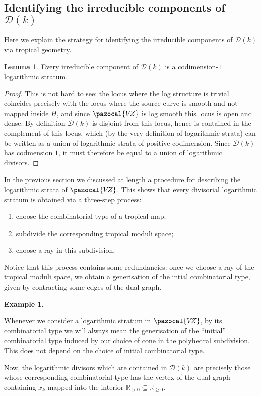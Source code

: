 \documentclass[11pt]{amsart}
\newcommand{\VZ}{\pazocal{V\!Z}}
\newcommand{\Dcal}{\mathcal{D}}
\newcommand{\RR}{\mathbb{R}}
\theoremstyle{definition}
\newtheorem{lemma}[thm]{Lemma}
\theoremstyle{definition}
\newtheorem{example}[thm]{Example}
\begin{document}
\subsection{Identifying the irreducible components of $\Dcal(k)$} Here we explain the strategy for identifying the irreducible components of $\Dcal(k)$ via tropical geometry.

\begin{lemma} Every irreducible component of $\Dcal(k)$ is a codimension-$1$ logarithmic stratum.\end{lemma}
\begin{proof} This is not hard to see: the locus where the log structure is trivial coincides precisely with the  locus where the source curve is smooth and not mapped inside $H$, and since $\VZ$ is log smooth this locus is open and dense. By definition $\Dcal(k)$ is disjoint from this locus, hence is contained in the  complement of this locus, which (by the very definition of logarithmic strata) can be written as a union of logarithmic strata of positive codimension. Since $\Dcal(k)$ has codmension $1$, it must therefore be equal to a union of logarithmic divisors.\end{proof}

In the previous section we discussed at length a procedure for describing the logarithmic strata of $\VZ$. This shows that every divisorial logarithmic stratum is obtained via a three-step process:
\begin{enumerate}
\item choose the combinatorial type of a tropical map;
\item subdivide the corresponding tropical moduli space;
\item choose a ray in this subdivision.
\end{enumerate}
Notice that this process contains some redundancies: once we choose a ray of the tropical moduli space, we obtain a generisation of the intial combinatorial type, given by contracting some edges of the dual graph.

\begin{example} \end{example}

Whenever we consider a logarithmic stratum in $\VZ$, by its combinatorial type we will always mean the generisation of the ``initial'' combinatorial type induced by our choice of cone in the polyhedral subdivision. This does not depend on the choice of initial combinatorial type.

Now, the logarithmic divisors which are contained in $\Dcal(k)$ are precisely those whose corresponding combinatorial type has the vertex of the dual graph containing $x_k$ mapped into the interior $\RR_{>0} \subseteq \RR_{\geq 0}$.
\end{document}
